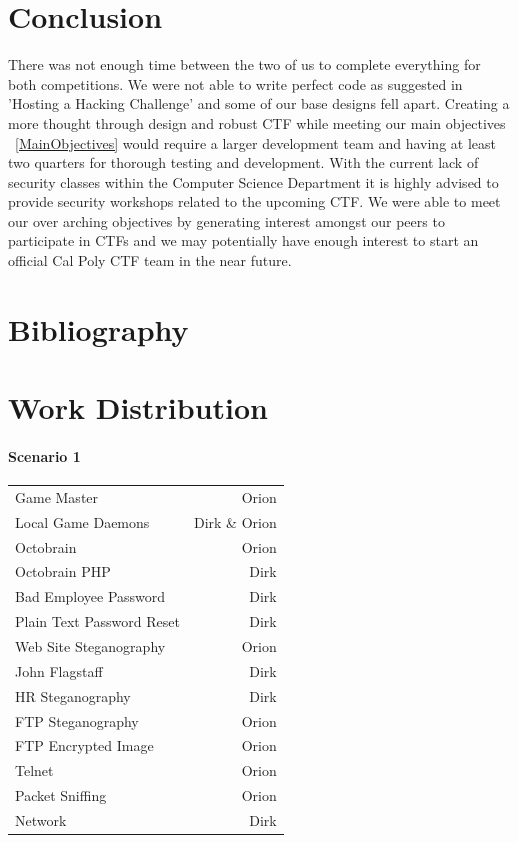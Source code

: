 \documentclass[10pt]{article}
\begin{document}
\section{Conclusion}
There was not enough time between the two of us to complete everything for both
competitions. We were not able to write perfect code as suggested in 'Hosting a Hacking 
Challenge' \cite{HostingHackingChallenge} and some of our base designs fell apart. 
Creating a more thought through design and robust CTF while meeting our main objectives 
~\ref{MainObjectives} would require a larger development team and having at least 
two quarters for thorough testing and development. With the current lack of security classes
within the Computer Science Department it is highly advised to provide security workshops 
related to the upcoming CTF. We were able to meet our over arching 
objectives by generating interest amongst our peers to participate in CTFs and we may 
potentially have enough interest to start an official Cal Poly CTF team in the near future.

\newpage
\nocite{*}
\section{Bibliography}





\newpage
\thispagestyle{empty}

\section*{Work Distribution}

\paragraph*{Scenario 1}

\begin{tabular}{l r}
   Game Master & Orion \\
   Local Game Daemons & Dirk \& Orion \\
   Octobrain & Orion \\
   Octobrain PHP & Dirk \\
   Bad Employee Password & Dirk \\
   Plain Text Password Reset & Dirk \\
   Web Site Steganography & Orion \\
   John Flagstaff & Dirk \\
   HR Steganography & Dirk \\
   FTP Steganography & Orion \\
   FTP Encrypted Image & Orion \\
   Telnet & Orion \\
   Packet Sniffing & Orion \\
   Network & Dirk \\
\end{tabular}
\end{document}
